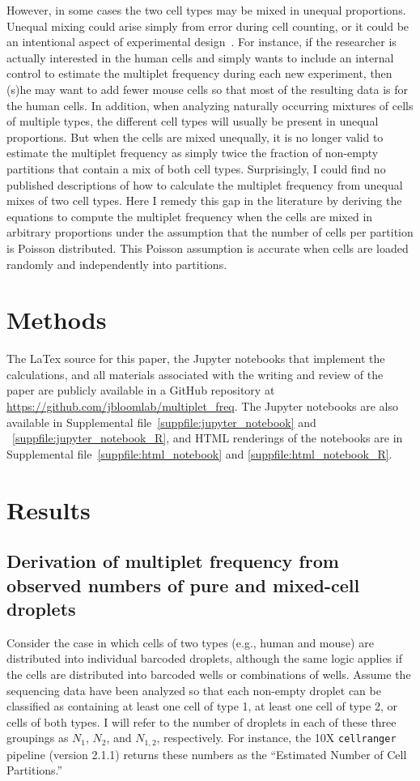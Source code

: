 \documentclass[fleqn,10pt]{wlpeerj} %
\begin{document}
However, in some cases the two cell types may be mixed in unequal proportions.
Unequal mixing could arise simply from error during cell counting, or it could be an intentional aspect of experimental design~\citep{rosenberg2018single}.
For instance, if the researcher is actually interested in the human cells and simply wants to include an internal control to estimate the multiplet frequency during each new experiment, then (s)he may want to add fewer mouse cells so that most of the resulting data is for the human cells.
In addition, when analyzing naturally occurring mixtures of cells of multiple types, the different cell types will usually be present in unequal proportions.
But when the cells are mixed unequally, it is no longer valid to estimate the multiplet frequency as simply twice the fraction of non-empty partitions that contain a mix of both cell types.
Surprisingly, I could find no published descriptions of how to calculate the multiplet frequency from unequal mixes of two cell types.
Here I remedy this gap in the literature by deriving the equations to compute the multiplet frequency when the cells are mixed in arbitrary proportions under the assumption that the number of cells per partition is Poisson distributed.
This Poisson assumption is accurate when cells are loaded randomly and independently into partitions. 

\section*{Methods}
The LaTex source for this paper, the Jupyter notebooks that implement the calculations, and all materials associated with the writing and review of the paper are publicly available in a GitHub repository at \url{https://github.com/jbloomlab/multiplet_freq}.
The Jupyter notebooks are also available in Supplemental file~\ref{suppfile:jupyter_notebook} and ~\ref{suppfile:jupyter_notebook_R}, and HTML renderings of the notebooks are in Supplemental file~\ref{suppfile:html_notebook} and \ref{suppfile:html_notebook_R}.

\section*{Results}
\label{sec:results}

\subsection*{Derivation of multiplet frequency from observed numbers of pure and mixed-cell droplets}
Consider the case in which cells of two types (e.g., human and mouse) are distributed into individual barcoded droplets, although the same logic applies if the cells are distributed into barcoded wells or combinations of wells.
Assume the sequencing data have been analyzed so that each non-empty droplet can be classified as containing at least one cell of type 1, at least one cell of type 2, or cells of both types.
I will refer to the number of droplets in each of these three groupings as $N_1$, $N_2$, and $N_{1,2}$, respectively.
For instance, the 10X \texttt{cellranger} pipeline (version 2.1.1) returns these numbers as the ``Estimated Number of Cell Partitions.''
\end{document}
